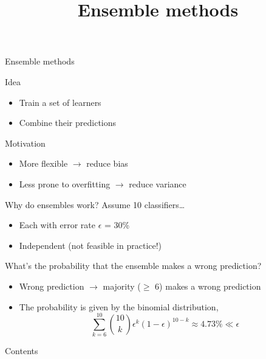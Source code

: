 

\title{Ensemble methods}



\maketitle

\begin{frame}{Ensemble methods}
    \begin{block}{Idea}
        \begin{itemize}
            \item Train a \alert{set} of learners
            \item Combine their predictions
        \end{itemize}
    \end{block}
    \vfill
    \begin{block}{Motivation}
        \begin{itemize}
            \item More flexible $\rightarrow$ reduce bias
            \item Less prone to overfitting $\rightarrow$ reduce variance
        \end{itemize}
    \end{block}
\end{frame}

\begin{frame}{Why do ensembles work?}
    Assume 10 classifiers\ldots
    \begin{itemize}
        \item Each with error rate $\epsilon$ = 30\%
        \item Independent (not feasible in practice!)
    \end{itemize}
    \vfill
    What's the probability that the ensemble makes a wrong prediction?
    \pause
    \begin{itemize}
        \item Wrong prediction $\rightarrow$ majority ($\geq$ 6) makes a wrong
              prediction
        \item The probability is given by the binomial distribution,
              \[
                  \sum_{k = 6}^{10} \binom{10}{k} \epsilon^{k} (1 - \epsilon)^{10 - k} \approx 4.73\% \ll \epsilon
              \]
    \end{itemize}
\end{frame}

\begin{frame}{Contents}
    \tableofcontents[hideallsubsections]
\end{frame}

